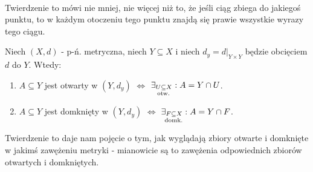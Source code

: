 \documentclass{article}
\numberwithin{defi}{section}
\numberwithin{theo}{section}
\numberwithin{defi}{section}
\newcommand{\subotw}{\underset{\clap{\scriptsize otw.}}{\subseteq}}
\newcommand{\subdomk}{\underset{\clap{\scriptsize domk.}}{\subseteq}}
\begin{document}
\paragraph*{} Twierdzenie to mówi nie mniej, nie więcej niż to, że jeśli ciąg zbiega do jakiegoś punktu, to w każdym otoczeniu tego punktu znajdą się prawie wszystkie wyrazy tego ciągu.

\begin{twier}{}
    Niech $(X, d)$ - p-ń. metryczna, niech $Y \subseteq X$ i niech $d_y = d | _{Y \times Y}$ będzie obcięciem $d$ do $Y$. Wtedy:
    \begin{enumerate}
        \item $A \subseteq Y$ jest otwarty w $(Y, d_y)$ $\iff$ $\exists_{U \subotw X}: A = Y \cap U$.
        \item $A \subseteq Y$ jest domknięty w $(Y, d_y)$ $\iff$ $\exists_{F \subdomk X}: A = Y \cap F$.
    \end{enumerate}
\end{twier}
Twierdzenie to daje nam pojęcie o tym, jak wyglądają zbiory otwarte i domknięte w jakimś zawężeniu metryki - mianowicie są to zawężenia odpowiednich zbiorów otwartych i domkniętych.
\end{document}
